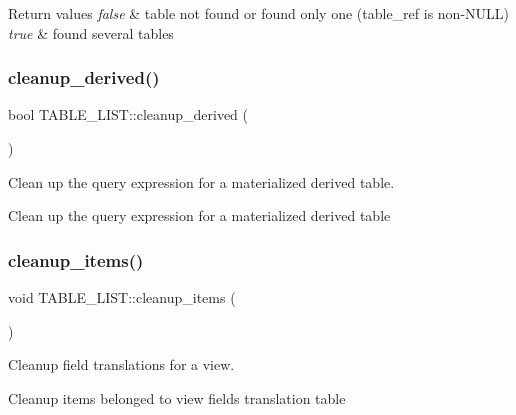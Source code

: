\begin{DoxyRetVals}{Return values}
{\em false} & table not found or found only one (table\+\_\+ref is non-\/N\+U\+LL) \\
\hline
{\em true} & found several tables \\
\hline
\end{DoxyRetVals}
\mbox{\label{structTABLE__LIST_ae5497aefdade6117117ff987e309d400}} 
\subsubsection{\texorpdfstring{cleanup\+\_\+derived()}{cleanup\_derived()}}
{\footnotesize\ttfamily bool T\+A\+B\+L\+E\+\_\+\+L\+I\+S\+T\+::cleanup\+\_\+derived (\begin{DoxyParamCaption}{ }\end{DoxyParamCaption})}



Clean up the query expression for a materialized derived table. 

Clean up the query expression for a materialized derived table \mbox{\label{structTABLE__LIST_a62d0e797cda12a471f03b5692ca94ac6}} 
\subsubsection{\texorpdfstring{cleanup\+\_\+items()}{cleanup\_items()}}
{\footnotesize\ttfamily void T\+A\+B\+L\+E\+\_\+\+L\+I\+S\+T\+::cleanup\+\_\+items (\begin{DoxyParamCaption}{ }\end{DoxyParamCaption})}



Cleanup field translations for a view. 

Cleanup items belonged to view fields translation table \mbox{\label{structTABLE__LIST_a0a5671d9a3ddbbcf1aeda9159f8e1704}} 

